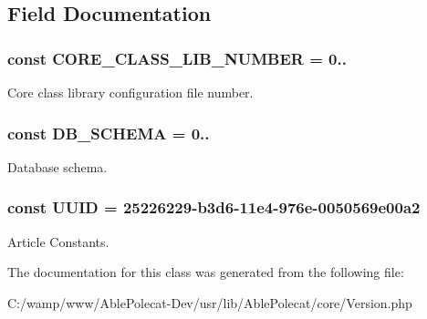 \subsection{Field Documentation}
\hypertarget{class_able_polecat___version_a95f92188f9e046f03cc99f9ee504baa8}{}
\subsubsection[{C\+O\+R\+E\+\_\+\+C\+L\+A\+S\+S\+\_\+\+L\+I\+B\+\_\+\+N\+U\+M\+B\+E\+R}]{\setlength{\rightskip}{0pt plus 5cm}const C\+O\+R\+E\+\_\+\+C\+L\+A\+S\+S\+\_\+\+L\+I\+B\+\_\+\+N\+U\+M\+B\+E\+R = \textquotesingle{}0..\textquotesingle{}}\label{class_able_polecat___version_a95f92188f9e046f03cc99f9ee504baa8}
Core class library configuration file number. \hypertarget{class_able_polecat___version_a3dabb8ef8d3bd6fa02733c41a6235316}{}
\subsubsection[{D\+B\+\_\+\+S\+C\+H\+E\+M\+A}]{\setlength{\rightskip}{0pt plus 5cm}const D\+B\+\_\+\+S\+C\+H\+E\+M\+A = \textquotesingle{}0..\textquotesingle{}}\label{class_able_polecat___version_a3dabb8ef8d3bd6fa02733c41a6235316}
Database schema. \hypertarget{class_able_polecat___version_a74b892c8c0b86bf9d04c5819898c51e7}{}
\subsubsection[{U\+U\+I\+D}]{\setlength{\rightskip}{0pt plus 5cm}const U\+U\+I\+D = \textquotesingle{}25226229-\/b3d6-\/11e4-\/976e-\/0050569e00a2\textquotesingle{}}\label{class_able_polecat___version_a74b892c8c0b86bf9d04c5819898c51e7}
Article Constants. 

The documentation for this class was generated from the following file\+:\begin{DoxyCompactItemize}
\item 
C\+:/wamp/www/\+Able\+Polecat-\/\+Dev/usr/lib/\+Able\+Polecat/core/Version.\+php\end{DoxyCompactItemize}
